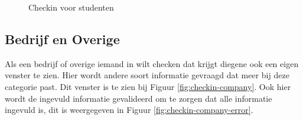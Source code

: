 \begin{figure}[Hh]
	\centering
	\caption{Checkin voor studenten}
\end{figure}

\subsection{Bedrijf en Overige}

Als een bedrijf of overige iemand in wilt checken dat krijgt diegene ook een eigen venster te zien. Hier wordt andere soort informatie gevraagd dat meer bij deze categorie past. Dit venster is te zien bij Figuur \ref{fig:checkin-company}. Ook hier wordt de ingevuld informatie gevalideerd om te zorgen dat alle informatie ingevuld is, dit is weergegeven in Figuur \ref{fig:checkin-company-error}. \\

